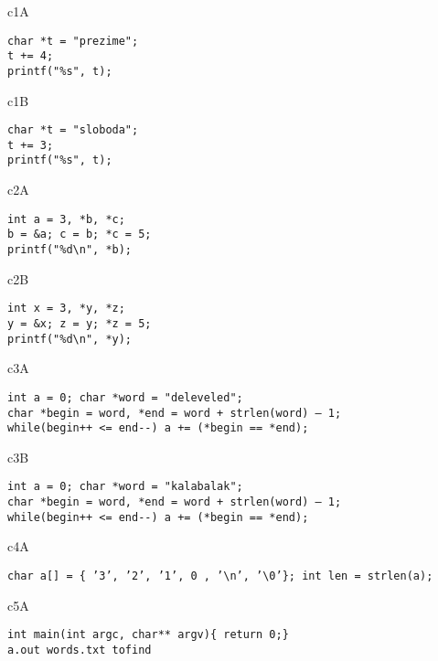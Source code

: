 
\begin{chunk}{c1A}
\begin{verbatim}
char *t = "prezime";
t += 4;
printf("%s", t);
\end{verbatim}
\end{chunk}

\begin{chunk}{c1B}
\begin{verbatim}
char *t = "sloboda";
t += 3;
printf("%s", t);
\end{verbatim}
\end{chunk}

\begin{chunk}{c2A}
\begin{verbatim}
int a = 3, *b, *c;
b = &a; c = b; *c = 5;
printf("%d\n", *b);
\end{verbatim}
\end{chunk}

\begin{chunk}{c2B}
\begin{verbatim}
int x = 3, *y, *z;
y = &x; z = y; *z = 5;
printf("%d\n", *y);
\end{verbatim}
\end{chunk}


\begin{chunk}{c3A}
\begin{verbatim}
int a = 0; char *word = "deleveled";
char *begin = word, *end = word + strlen(word) – 1;
while(begin++ <= end--) a += (*begin == *end);
\end{verbatim}
\end{chunk}

\begin{chunk}{c3B}
\begin{verbatim}
int a = 0; char *word = "kalabalak";
char *begin = word, *end = word + strlen(word) – 1;
while(begin++ <= end--) a += (*begin == *end);
\end{verbatim}
\end{chunk}

\begin{chunk}{c4A}
\begin{verbatim}
char a[] = { ’3’, ’2’, ’1’, 0 , ’\n’, ’\0’}; int len = strlen(a);
\end{verbatim}
\end{chunk}

\begin{chunk}{c5A}
\begin{verbatim}
int main(int argc, char** argv){ return 0;}
a.out words.txt tofind
\end{verbatim}
\end{chunk}

